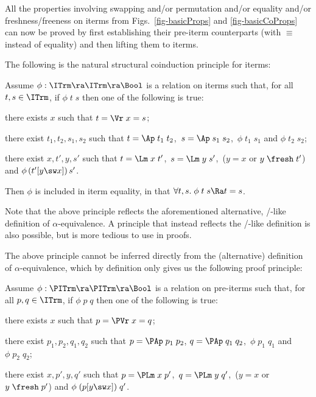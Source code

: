  All the properties involving swapping and/or permutation and/or equality and/or freshness/freeness on iterms from Figs.~\ref{fig-basicProps} and \ref{fig-basicCoProps} can now be proved by first establishing their pre-iterm counterparts (with $\equiv$ instead of equality) and then lifting them to iterms. 
 
 The following is the natural structural coinduction principle for iterms:
 
 \begin{prop} \rm 
 	\label{prop-coind-iterm}
 	Assume $\phi : \ITrm \ra \ITrm \ra \Bool$ is a relation on iterms such that, for all $t,s\in\ITrm$, if $\phi\;t\;s$ then one of the following is true: 
 	\begin{mmmyitem} 
 		\item there exists $x$ such that $t = \Vr\;x = s$; 
 		\item there exist $t_1,t_2,s_1,s_2$ such that 
 		$t = \Ap\;t_1\;t_2$, \,$s = \Ap\;s_1\;s_2$, \,$\phi\;t_1\;s_1$ and $\phi\;t_2\;s_2$; 
 		\item there exist $x,t',y,s'$ such that 
 		$t = \Lm\;x\;t'$, \,$s = \Lm\;y\;s'$, 
 		\,($y  = x$ or $y\;\fresh\;t'$) and 
 		$\phi\,(t'[y\sw x])\,s'$. 
 	\end{mmmyitem} 
 	
 	Then $\phi$ is included in iterm equality, in that 
 	$\forall t,s.\;\phi\;t\;s \Ra t = s$.
 \end{prop}

Note that the above principle reflects the aforementioned alternative, \SwBvr{}/\ISwBvr{}-like definition of $\alpha$-equivalence. A principle that instead reflects the  \SwCg{}/\ISwCg{}-like definition is also possible, but is more tedious to use in proofs. 

The above principle cannot be inferred directly from the (alternative) definition of $\alpha$-equivalence, which by definition only gives us the following proof principle: 


	Assume $\phi : \PITrm \ra \PITrm \ra \Bool$ is a relation on pre-iterms such that, for all $p,q\in\ITrm$, if $\phi\;p\;q$ then one of the following is true: 
	\begin{mmmyitem} 
		\item there exists $x$ such that $p = \PVr\;x = q$; 
		\item there exist $p_1,p_2,q_1,q_2$ such that 
		$p = \PAp\;p_1\;p_2$, $q = \PAp\;q_1\;q_2$, \,$\phi\;p_1\;q_1$ and $\phi\;p_2\;q_2$; 
		\item there exist $x,p',y,q'$ such that 
		$p = \PLm\;x\;p'$, \,$q = \PLm\;y\;q'$, 
		\,($y  = x$ or $y\;\fresh\;p'$) and 
		$\phi\;(p[y\sw x])\;q'$. 
	\end{mmmyitem} 
	
